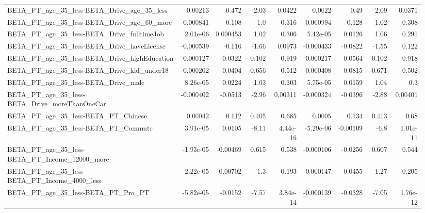 \begin{tabular}{lrrrrrrrr}
BETA\_PT\_age\_35\_less-BETA\_Drive\_age\_35\_less         &     0.00213 &        0.472 &     -2.03 &   0.0422 &     0.0022 &        0.49 &        -2.09 &        0.0371 \\
BETA\_PT\_age\_35\_less-BETA\_Drive\_age\_60\_more         &    0.000841 &        0.108 &       1.0 &    0.316 &   0.000994 &       0.128 &         1.02 &         0.308 \\
BETA\_PT\_age\_35\_less-BETA\_Drive\_fulltimeJob         &    2.01e-06 &     0.000453 &      1.02 &    0.306 &   5.42e-05 &      0.0126 &         1.06 &         0.291 \\
BETA\_PT\_age\_35\_less-BETA\_Drive\_haveLicense         &   -0.000539 &       -0.116 &     -1.66 &   0.0973 &  -0.000433 &     -0.0822 &        -1.55 &         0.122 \\
BETA\_PT\_age\_35\_less-BETA\_Drive\_highEducation       &   -0.000127 &      -0.0322 &     0.102 &    0.919 &  -0.000217 &     -0.0564 &        0.102 &         0.918 \\
BETA\_PT\_age\_35\_less-BETA\_Drive\_kid\_under18         &    0.000202 &       0.0404 &    -0.656 &    0.512 &   0.000408 &      0.0815 &       -0.671 &         0.502 \\
BETA\_PT\_age\_35\_less-BETA\_Drive\_male                &    8.26e-05 &       0.0224 &      1.03 &    0.303 &   5.75e-05 &      0.0159 &         1.04 &           0.3 \\
BETA\_PT\_age\_35\_less-BETA\_Drive\_moreThanOneCar      &   -0.000402 &      -0.0513 &     -2.96 &  0.00311 &  -0.000324 &     -0.0396 &        -2.88 &       0.00401 \\
BETA\_PT\_age\_35\_less-BETA\_PT\_Chinese                &     0.00042 &        0.112 &     0.405 &    0.685 &     0.0005 &       0.134 &        0.413 &          0.68 \\
BETA\_PT\_age\_35\_less-BETA\_PT\_Commute                &    3.91e-05 &       0.0105 &     -8.11 & 4.44e-16 &  -5.29e-06 &    -0.00109 &         -6.8 &      1.01e-11 \\
BETA\_PT\_age\_35\_less-BETA\_PT\_Income\_12000\_more      &   -1.93e-05 &     -0.00469 &     0.615 &    0.538 &  -0.000106 &     -0.0256 &        0.607 &         0.544 \\
BETA\_PT\_age\_35\_less-BETA\_PT\_Income\_4000\_less       &   -2.22e-05 &     -0.00702 &      -1.3 &    0.193 &  -0.000147 &     -0.0455 &        -1.27 &         0.205 \\
BETA\_PT\_age\_35\_less-BETA\_PT\_Pro\_PT                 &   -5.82e-05 &      -0.0152 &     -7.57 & 3.84e-14 &  -0.000139 &     -0.0328 &        -7.05 &      1.76e-12 \\

\end{tabular}
